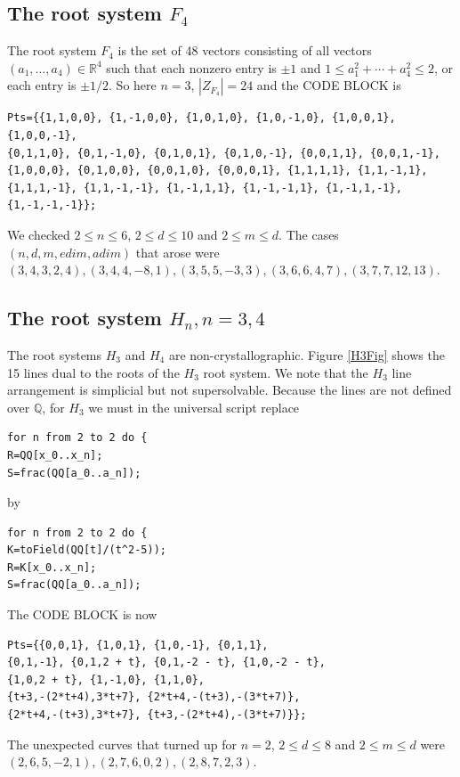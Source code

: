 \documentclass[12pt]{amsart}
\numberwithin{equation}{section}
\theoremstyle{definition}
\newcommand{\QQ}{ \ensuremath{\mathbb{Q}}}
\newcommand{\RR}{ \ensuremath{\mathbb{R}}}
\begin{document}
\subsection{The root system \texorpdfstring{$F_4$}{F4}}
The root system $F_4$ is the set of 48 vectors consisting of all vectors $(a_1,\ldots,a_4)\in\RR^4$ 
such that each nonzero entry is $\pm1$ and $1\leq a_1^2+\cdots+a_4^2\leq2$,
or each entry is $\pm1/2$.
So here $n=3$, $|Z_{F_4}|=24$ and the CODE BLOCK is
\begin{verbatim}
Pts={{1,1,0,0}, {1,-1,0,0}, {1,0,1,0}, {1,0,-1,0}, {1,0,0,1}, {1,0,0,-1}, 
{0,1,1,0}, {0,1,-1,0}, {0,1,0,1}, {0,1,0,-1}, {0,0,1,1}, {0,0,1,-1}, 
{1,0,0,0}, {0,1,0,0}, {0,0,1,0}, {0,0,0,1}, {1,1,1,1}, {1,1,-1,1}, 
{1,1,1,-1}, {1,1,-1,-1}, {1,-1,1,1}, {1,-1,-1,1}, {1,-1,1,-1}, {1,-1,-1,-1}};
\end{verbatim}
We checked $2\leq n\leq6$, $2\leq d\leq 10$ and $2\leq m\leq d$. The cases $({n, d, m, edim, adim})$ 
that arose were
$({3, 4, 3, 2, 4}),
({3, 4, 4, -8, 1}),
({3, 5, 5, -3, 3}),
({3, 6, 6, 4, 7}),
({3, 7, 7, 12, 13})$.

\subsection{The root system \texorpdfstring{$H_n,n=3,4$}{Hn, n=3,4}}
The root systems $H_3$ and $H_4$ are non-crystallographic.
Figure \ref{H3Fig} shows the 15 lines dual to the roots of the $H_3$ root system.
We note that the $H_3$ line arrangement is simplicial but not supersolvable.
Because the lines are not defined over $\QQ$,
for $H_3$ we must in the universal script replace
\begin{verbatim}
for n from 2 to 2 do {
R=QQ[x_0..x_n]; 
S=frac(QQ[a_0..a_n]); 
\end{verbatim}
by
\begin{verbatim}
for n from 2 to 2 do {
K=toField(QQ[t]/(t^2-5));
R=K[x_0..x_n];
S=frac(QQ[a_0..a_n]); 
\end{verbatim}
\medskip
The CODE BLOCK is now
\begin{verbatim}
Pts={{0,0,1}, {1,0,1}, {1,0,-1}, {0,1,1},
{0,1,-1}, {0,1,2 + t}, {0,1,-2 - t}, {1,0,-2 - t},
{1,0,2 + t}, {1,-1,0}, {1,1,0},
{t+3,-(2*t+4),3*t+7}, {2*t+4,-(t+3),-(3*t+7)},
{2*t+4,-(t+3),3*t+7}, {t+3,-(2*t+4),-(3*t+7)}};
\end{verbatim}
The unexpected curves that turned up for $n=2$, $2\leq d\leq 8$ and $2\leq m\leq d$ were
$({2, 6, 5, -2, 1}),
({2, 7, 6, 0, 2}),
({2, 8, 7, 2, 3})$.
\end{document}
